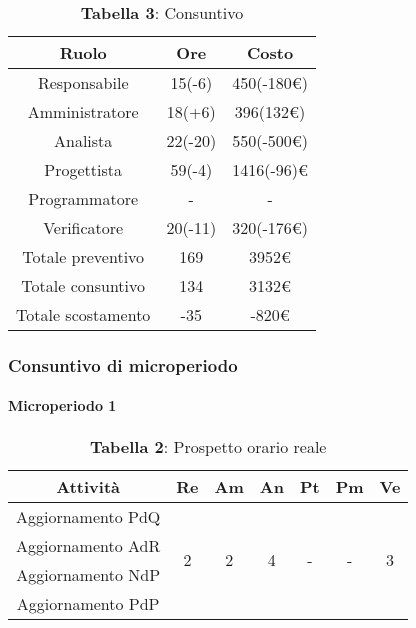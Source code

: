 \begin{table}[H]
	\centering
	\renewcommand{\arraystretch}{1.5}
	\begin{tabular}{|c|c|c|}
		\hline
		\rowcolor{lighter-grayer}
		Ruolo & Ore & Costo \\ \hline
		Responsabile & 15(-6) & 450(-180\euro) \\ \hline
		Amministratore & 18(+6) & 396(132\euro) \\ \hline
		Analista & 22(-20) & 550(-500\euro) \\ \hline
		Progettista & 59(-4) & 1416(-96)\euro \\ \hline
		Programmatore & - & - \\ \hline
		Verificatore & 20(-11) & 320(-176\euro) \\ \hline
		Totale preventivo & 169 & 3952\euro \\ \hline
		Totale consuntivo & 134 & 3132\euro \\ \hline
		Totale scostamento & -35 & -820\euro \\ \hline
	\end{tabular}
	\caption*{\textbf{Tabella 3}: Consuntivo\\}
\end{table}


\subsubsection{Consuntivo di microperiodo}
\paragraph{Microperiodo 1}
\begin{table}[H]
	\centering
	\begin{tabular}{|c|c|c|c|c|c|c|}
		\hline
		\rowcolor{lighter-grayer}
		\textbf{Attività} & \textbf{Re}        & \textbf{Am}        & \textbf{An}        & \textbf{Pt}        & \textbf{Pm}        & \textbf{Ve}        \\ \hline
		Aggiornamento PdQ & \multirow{4}{*}{2} & \multirow{4}{*}{2} & \multirow{4}{*}{4} & \multirow{4}{*}{-} & \multirow{4}{*}{-} & \multirow{4}{*}{3} \\ \cline{1-1}
		Aggiornamento AdR &                    &                    &                    &                    &                    &                    \\ \cline{1-1}
		Aggiornamento NdP &                    &                    &                    &                    &                    &                    \\ \cline{1-1}
		Aggiornamento PdP &                    &                    &                    &                    &                    &                    \\ \hline
	\end{tabular}
	\caption*{\textbf{Tabella 2}: Prospetto orario reale\\}
\end{table}

